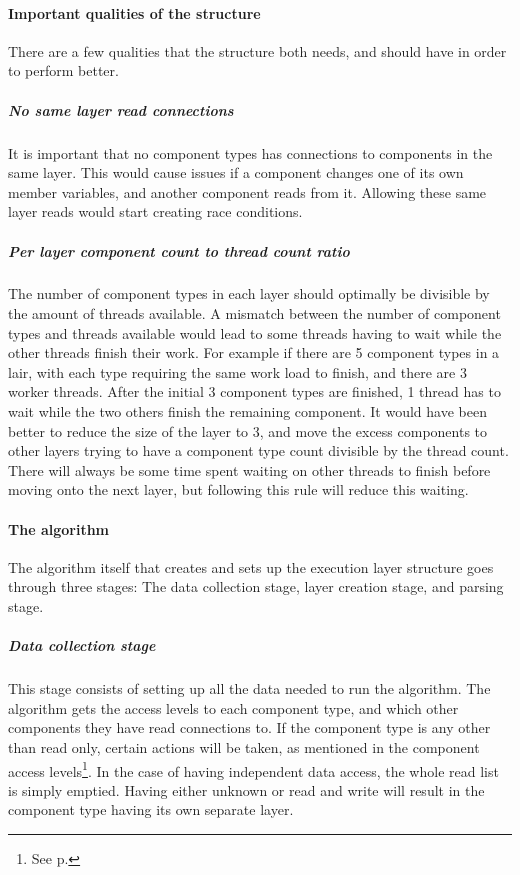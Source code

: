 \paragraph{Important qualities of the structure}
There are a few qualities that the structure both needs, and should have in order to perform better.

\subparagraph{No same layer read connections}
It is important that no component types has connections to components in the same layer.
This would cause issues if a component changes one of its own member variables, and another component reads from it.
Allowing these same layer reads would start creating race conditions.

\subparagraph{Per layer component count to thread count ratio}
The number of component types in each layer should optimally be divisible by the amount of threads available.
A mismatch between the number of component types and threads available would lead to some threads having to wait while the other threads finish their work.
For example if there are 5 component types in a lair, with each type requiring the same work load to finish, and there are 3 worker threads.
After the initial 3 component types are finished, 1 thread has to wait while the two others finish the remaining component.
It would have been better to reduce the size of the layer to 3, and move the excess components to other layers trying to have a component type count divisible by the thread count.
There will always be some time spent waiting on other threads to finish before moving onto the next layer, but following this rule will reduce this waiting.

\paragraph{The algorithm}
The algorithm itself that creates and sets up the execution layer structure goes through three stages: The data collection stage, layer creation stage, and parsing stage.

\subparagraph{Data collection stage}
This stage consists of setting up all the data needed to run the algorithm.
The algorithm gets the access levels to each component type, and which other components they have read connections to.
If the component type is any other than read only, certain actions will be taken, as mentioned in the component access levels\footnote{See p.\pageref{subsec:detailed_component_access_levels}}.
In the case of having independent data access, the whole read list is simply emptied.
Having either unknown or read and write will result in the component type having its own separate layer.

